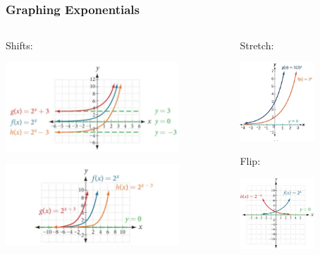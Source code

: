 \documentclass{beamer}
\begin{document}
\begin{frame}\frametitle{Graphing Exponentials}
\begin{columns}
\begin{column}{7cm}

Shifts:
\begin{center}
\includegraphics[width=6.5cm]{fig/exp2vert.jpg}
\end{center}

\begin{center}
\includegraphics[width=6.5cm]{fig/exp2hor.jpg}
\end{center}

\end{column}

\begin{column}{5cm}
Stretch:
\begin{center}
\includegraphics[width=2.8cm]{fig/exp2v.jpg}
\end{center}

Flip:
\begin{center}
\includegraphics[width =2.8cm]{fig/exp2f.jpg}
\end{center}
\end{column}
\end{columns}

\end{frame}
\end{document}
